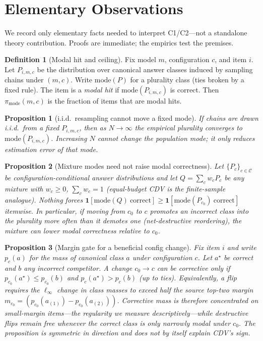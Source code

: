 \documentclass{article}
\newcommand{\pmode}{\pi_{\mathrm{mode}}}
\theoremstyle{plain}
\newtheorem{proposition}{Proposition}
\theoremstyle{definition}
\newtheorem{definition}{Definition}
\theoremstyle{remark}
\begin{document}
\section{Elementary Observations}
\label{sec:formal}

We record only elementary facts needed to interpret C1/C2---not a standalone
theory contribution. Proofs are immediate; the empirics test the premises.

\begin{definition}[Modal hit and ceiling]
Fix model $m$, configuration $c$, and item $i$. Let $P_{i,m,c}$ be the
distribution over canonical answer classes induced by sampling chains under
$(m,c)$. Write $\mathrm{mode}(P)$ for a plurality class (ties broken by a fixed
rule). The item is a \emph{modal hit} if $\mathrm{mode}(P_{i,m,c})$ is correct.
Then $\pmode(m,c)$ is the fraction of items that are modal hits.
\end{definition}

\begin{proposition}[i.i.d.\ resampling cannot move a fixed mode]
\label{prop:iid-frozen}
If chains are drawn i.i.d.\ from a fixed $P_{i,m,c}$, then as $N\to\infty$ the
empirical plurality converges to $\mathrm{mode}(P_{i,m,c})$. Increasing $N$
cannot change the population mode; it only reduces estimation error of that mode.
\end{proposition}

\begin{proposition}[Mixture modes need not raise modal correctness]
\label{prop:mixture-not-monotone}
Let $\{P_c\}_{c\in\mathcal{C}}$ be configuration-conditional answer
distributions and let $Q=\sum_{c} w_c P_c$ be any mixture with $w_c\ge 0$,
$\sum_c w_c=1$ (equal-budget CDV is the finite-sample analogue).
Nothing forces $\mathbf{1}[\mathrm{mode}(Q)\ \mathrm{correct}] \ge
\mathbf{1}[\mathrm{mode}(P_{c_0})\ \mathrm{correct}]$ itemwise. In particular,
if moving from $c_0$ to $c$ promotes an incorrect class into the plurality more
often than it demotes one (net-destructive reordering), the mixture can
\emph{lower} modal correctness relative to $c_0$.
\end{proposition}

\begin{proposition}[Margin gate for a beneficial config change]
\label{prop:margin-gate}
Fix item $i$ and write $p_c(a)$ for the mass of canonical class $a$ under
configuration $c$. Let $a^\star$ be correct and $b$ any incorrect competitor.
A change $c_0\to c$ can be corrective only if $p_{c_0}(a^\star)\le p_{c_0}(b)$
and $p_c(a^\star)>p_c(b)$ (up to ties). Equivalently, a flip requires the
$\ell_\infty$ change in class masses to exceed half the source top-two margin
$m_{c_0}=(p_{c_0}(a_{(1)})-p_{c_0}(a_{(2)}))$. Corrective mass is therefore
concentrated on small-margin items---the regularity we measure
descriptively---while destructive flips remain free whenever the correct class
is only narrowly modal under $c_0$. The proposition is symmetric in direction
and does not by itself explain CDV's sign.
\end{proposition}
\end{document}
